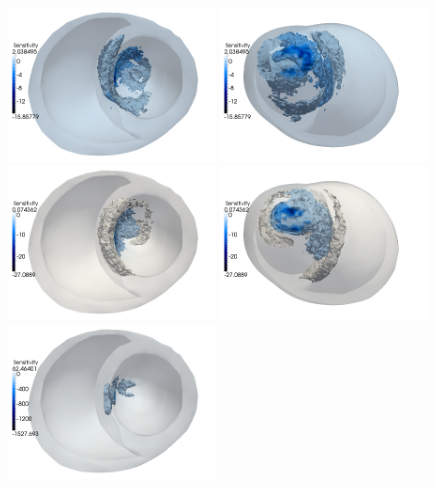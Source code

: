 \documentclass[a4paper, reqno]{amsart}
\numberwithin{equation}{section}
\begin{document}
\begin{figure}
  \includegraphics[width=0.49\textwidth]{png/g_el_plusx.png}
  \includegraphics[width=0.49\textwidth]{png/g_el_minusx.png}
  \includegraphics[width=0.49\textwidth]{png/g_et_plusx.png}
  \includegraphics[width=0.49\textwidth]{png/g_et_minusx.png}
  \includegraphics[width=0.49\textwidth]{png/g_il_plusx.png}

\end{figure}
\end{document}
